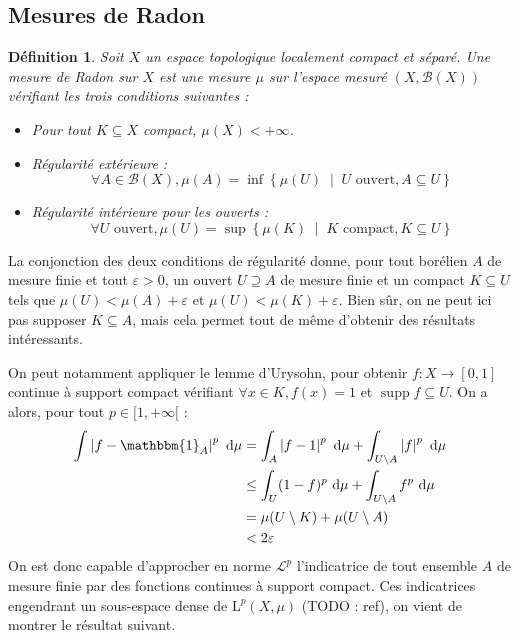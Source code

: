 \documentclass[a4paper,12pt]{article}
\newtheorem{definition}[theorem]{Définition}
\newcommand{\Bor}{\mathcal{B}}
\newcommand{\abs}[1]{\left\vert#1\right\vert}
\newcommand{\set}[1]{\left\{ #1 \right\}}
\newcommand{\indic}{\mathbbm{1}}
\newcommand{\integral}[4]{\int_{#1}^{#2} #3~\mathrm{d}#4}
\newcommand{\tq}{\;\middle|\;}
\newcommand{\TODO}[1]{{\color{red}TODO :} #1}
\DeclareMathOperator{\Supp}{supp}
\begin{document}
\subsection*{Mesures de Radon}

\begin{definition}
    Soit $X$ un espace topologique localement compact et séparé. Une \emph{mesure de Radon} sur $X$
    est une mesure $\mu$ sur l'espace mesuré $(X, \Bor(X))$ vérifiant les trois conditions suivantes :
    \begin{itemize}
        \item Pour tout $K\subseteq X$ compact, $\mu(X)<+\infty$.
        \item Régularité extérieure : 
        \begin{equation*}
            \forall A\in\Bor(X), \mu(A) = \inf \set{\mu(U) \tq U\text{ ouvert}, A\subseteq U}
        \end{equation*}
        \item Régularité intérieure pour les ouverts : 
        \begin{equation*}
            \forall U\text{ ouvert}, \mu(U) = \sup \set{\mu(K) \tq K\text{ compact}, K\subseteq U}
        \end{equation*}
    \end{itemize}
\end{definition}

La conjonction des deux conditions de régularité donne, pour tout borélien $A$ de mesure finie et tout $\varepsilon>0$,
un ouvert $U\supseteq A$ de mesure finie et un compact $K\subseteq U$ tels que $\mu(U)<\mu(A)+\varepsilon$ et 
$\mu(U)<\mu(K)+\varepsilon$. Bien sûr, on ne peut ici pas supposer $K\subseteq A$, mais cela permet 
tout de même d'obtenir des résultats intéressants.

On peut notamment appliquer le lemme d'Urysohn, pour obtenir $f:X\to[0,1]$ continue à support compact
vérifiant $\forall x\in K, f(x) = 1$ et $\Supp f\subseteq U$. On a alors, pour tout $p\in[1, +\infty[$ : 
\begin{align*}
    \integral{}{}{\abs{f-\indic_A}^p}{\mu} 
        &= \integral{A}{}{\abs{f-1}^p}{\mu} + \integral{U\setminus A}{}{\abs{f}^p}{\mu} \\
        &\le \integral{U}{}{(1-f)^p}{\mu} + \integral{U\setminus A}{}{f^p}{\mu} \\
        &= \mu(U\setminus K) + \mu(U\setminus A) \\
        &< 2\varepsilon
\end{align*}
On est donc capable d'approcher en norme $\mathscr{L}^p$ l'indicatrice de tout ensemble $A$ de mesure finie par des fonctions continues 
à support compact. Ces indicatrices engendrant un sous-espace dense de $\mathrm{L}^p(X, \mu)$ (\TODO{ref}), on vient de montrer le résultat suivant.
\end{document}
